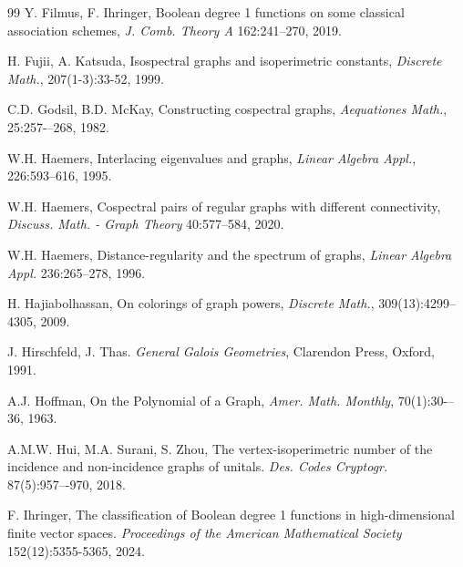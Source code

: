 \documentclass[a4paper,11pt]{article}
\theoremstyle{definition}
\newcommand{\marrow}{\marginpar[\hfill$\longrightarrow$]{$\longleftarrow$}}
\newcommand{\niceremarkcolor}[4]{\textcolor{#4}{\textsc{#1 #2:} \marrow\textsf{#3}}}
\newcommand{\jim}[2][says]{\niceremarkcolor{Jim}{#1}{#2}{Green}}
\begin{document}
\begin{thebibliography}{99}
 Y. Filmus, F. Ihringer,
Boolean degree 1 functions on some classical association schemes,
\emph{J. Comb. Theory A} 162:241--270, 2019.

 H. Fujii, A. Katsuda, Isospectral graphs and isoperimetric constants, \textit{Discrete Math.}, 207(1-3):33-52, 1999.


 C.D. Godsil, B.D. McKay, Constructing cospectral graphs, \emph{Aequationes Math.}, 25:257-–268, 1982.




 W.H. Haemers, Interlacing eigenvalues and graphs, \emph{Linear Algebra Appl.}, 226:593–616, 1995.  


 W.H. Haemers, Cospectral pairs of regular graphs with different connectivity, \emph{Discuss. Math. - Graph Theory} 40:577--584, 2020. 

 W.H. Haemers, Distance-regularity and the spectrum of graphs, \emph{Linear Algebra Appl.} 236:265--278, 1996.


 H. Hajiabolhassan, On colorings of graph powers, \emph{Discrete Math.}, 309(13):4299--4305, 2009.

 J. Hirschfeld, J. Thas. \emph{General Galois Geometries}, Clarendon Press, Oxford, 1991.

 A.J. Hoffman, On the Polynomial of a Graph, \emph{Amer. Math. Monthly}, 70(1):30-–36, 1963.


 A.M.W. Hui, M.A. Surani, S. Zhou, The vertex-isoperimetric number of the incidence and non-incidence graphs of unitals. \emph{Des. Codes Cryptogr.} 87(5):957–-970, 2018.

 F. Ihringer, The classification of Boolean degree 1 functions in high-dimensional finite vector spaces. \emph{Proceedings of the American Mathematical Society} 152(12):5355-5365, 2024.


\end{thebibliography}
\end{document}

